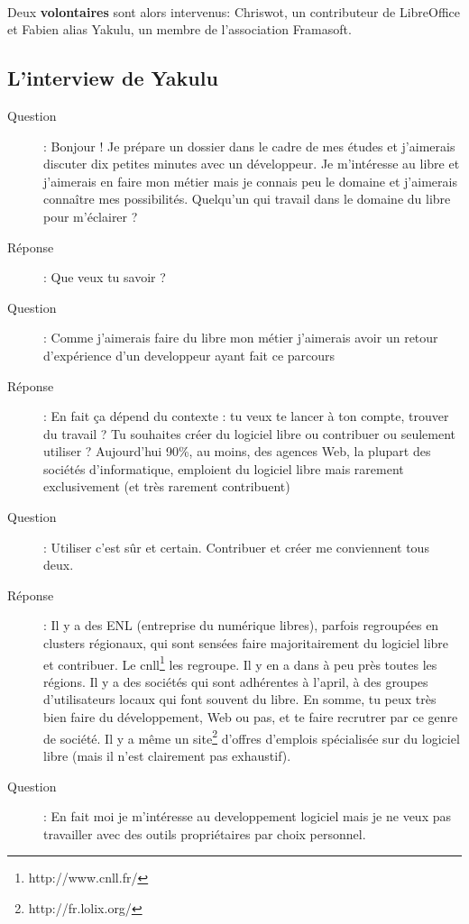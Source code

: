 \documentclass[a4paper,12pt, draft]{report}
\begin{document}
\paragraph{}
Deux \textbf{volontaires} sont alors intervenus: Chriswot, un contributeur de LibreOffice et Fabien alias Yakulu, un membre de l'association Framasoft.


\subsection{L'interview de Yakulu}

\begin{description}
\item [Question]:  Bonjour ! Je prépare un dossier dans le cadre de mes études et j'aimerais discuter dix petites minutes avec un développeur. Je m'intéresse au libre et j'aimerais en faire mon métier mais je connais peu le domaine et j'aimerais connaître mes possibilités. Quelqu'un qui travail dans le domaine du libre pour m'éclairer ?
\item [Réponse]:  Que veux tu savoir ?
\item [Question]:  Comme j'aimerais faire du libre mon métier j'aimerais avoir un retour d'expérience d'un developpeur ayant fait ce parcours
\item [Réponse]:  En fait ça dépend du contexte : tu veux te lancer à ton compte, trouver du travail ? Tu souhaites créer du logiciel libre ou contribuer ou seulement utiliser ? Aujourd'hui 90\%, au moins, des agences Web, la plupart des sociétés d'informatique, emploient du logiciel libre mais rarement exclusivement (et très rarement contribuent)
\item [Question]:  Utiliser c'est sûr et certain. Contribuer et créer me conviennent tous deux.
\item [Réponse]:  Il y a des ENL (entreprise du numérique libres), parfois regroupées en clusters régionaux, qui sont sensées faire majoritairement du logiciel libre et contribuer. Le cnll\footnote{http://www.cnll.fr/} les regroupe. Il y en a dans à peu près toutes les régions. Il y a des sociétés qui sont adhérentes à l'april, à des groupes d'utilisateurs locaux qui font souvent du libre. En somme, tu peux très bien faire du développement, Web ou pas, et te faire recrutrer par ce genre de société. Il y a même un site\footnote{http://fr.lolix.org/} d'offres d'emplois spécialisée sur du logiciel libre (mais il n'est clairement pas exhaustif).
\item [Question]:  En fait moi je m'intéresse au developpement logiciel mais je ne veux pas travailler avec des outils propriétaires par choix personnel.

\end{description}
\end{document}
